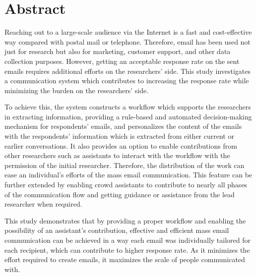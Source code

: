 \clearemptydoublepage
{}
{}	

\chapter*{Abstract}

Reaching out to a large-scale audience via the Internet is a fast and cost-effective way compared with postal mail or telephone. Therefore, email has been used not just for research but also for marketing, customer support, and other data collection purposes. However, getting an acceptable response rate on the sent emails requires additional efforts on the researchers' side. This study investigates a communication system which contributes to increasing the response rate while minimizing the burden on the researchers' side. 
\vspace{1cm}

To achieve this, the system constructs a workflow which supports the researchers in extracting information, providing a rule-based and automated decision-making mechanism for respondents' emails, and personalizes the content of the emails with the respondents' information which is extracted from either current or earlier conversations. It also provides an option to enable contributions from other researchers such as assistants to interact with the workflow with the permission of the initial researcher. Therefore, the distribution of the work can ease an individual's efforts of the mass email communication. This feature can be further extended by enabling crowd assistants to contribute to nearly all phases of the communication flow and getting guidance or assistance from the lead researcher when required.
\vspace{1cm}

This study demonstrates that by providing a proper workflow and enabling the possibility of an assistant's contribution, effective and efficient mass email communication can be achieved in a way each email was individually tailored for each recipient, which can contribute to higher response rate. As it minimizes the effort required to create emails, it maximizes the scale of people communicated with.
